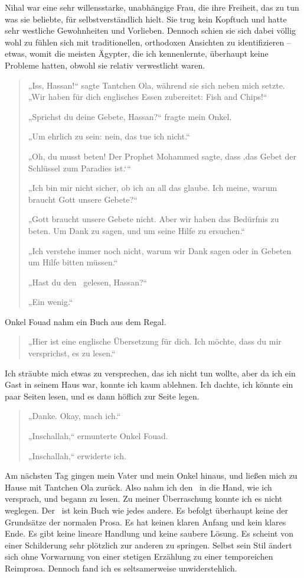 \documentclass[12pt]{memoir}
\begin{document}
Nihal war eine sehr willensstarke, unabhängige Frau, die ihre Freiheit,
das zu tun was sie beliebte, für selbstverständlich hielt.
Sie trug kein Kopftuch und hatte sehr westliche Gewohnheiten und Vorlieben.
Dennoch schien sie sich dabei völlig wohl zu fühlen sich mit traditionellen,
orthodoxen Ansichten zu identifizieren – etwas, womit die meisten Ägypter,
die ich kennenlernte, überhaupt keine Probleme hatten,
obwohl sie relativ verwestlicht waren.

\begin{quote}
„Iss, Hassan!“ sagte Tantchen Ola, während sie sich neben mich setzte.
„Wir haben für dich englisches Essen zubereitet: Fish and Chips!“

„Sprichst du deine Gebete, Hassan?“ fragte mein Onkel.

„Um ehrlich zu sein: nein, das tue ich nicht.“

„Oh, du musst beten! Der Prophet Mohammed sagte,
dass ‚das Gebet der Schlüssel zum Paradies ist.‘“

„Ich bin mir nicht sicher, ob ich an all das glaube.
Ich meine, warum braucht Gott unsere Gebete?“

„Gott braucht unsere Gebete nicht. Aber wir haben das Bedürfnis zu beten.
Um Dank zu sagen, und um seine Hilfe zu ersuchen.“

„Ich verstehe immer noch nicht,
warum wir Dank sagen oder in Gebeten um Hilfe bitten müssen.“

„Hast du den \Quran\ gelesen, Hassan?“

„Ein wenig.“
\end{quote}

Onkel Fouad nahm ein Buch aus dem Regal.

\begin{quote}
„Hier ist eine englische Übersetzung für dich.
Ich möchte, dass du mir versprichst, es zu lesen.“
\end{quote}

Ich sträubte mich etwas zu versprechen, das ich nicht tun wollte,
aber da ich ein Gast in seinem Haus war, konnte ich kaum ablehnen.
Ich dachte, ich könnte ein paar Seiten lesen,
und es dann höflich zur Seite legen.

\begin{quote}
„Danke. Okay, mach ich.“

„Inschallah,“ ermunterte Onkel Fouad.

„Inschallah,“ erwiderte ich.
\end{quote}

Am nächsten Tag gingen mein Vater und mein Onkel hinaus,
und ließen mich zu Hause mit Tantchen Ola zurück.
Also nahm ich den \Quran\ in die Hand, wie ich versprach, und begann zu lesen.
Zu meiner Überraschung konnte ich es nicht weglegen.
Der \Quran\ ist kein Buch wie jedes andere.
Es befolgt überhaupt keine der Grundsätze der normalen Prosa.
Es hat keinen klaren Anfang und kein klares Ende.
Es gibt keine lineare Handlung und keine saubere Lösung.
Es scheint von einer Schilderung sehr plötzlich zur anderen zu springen.
Selbst sein Stil ändert sich ohne Vorwarnung von einer stetigen Erzählung
zu einer temporeichen Reimprosa.
Dennoch fand ich es seltsamerweise unwiderstehlich.
\end{document}
